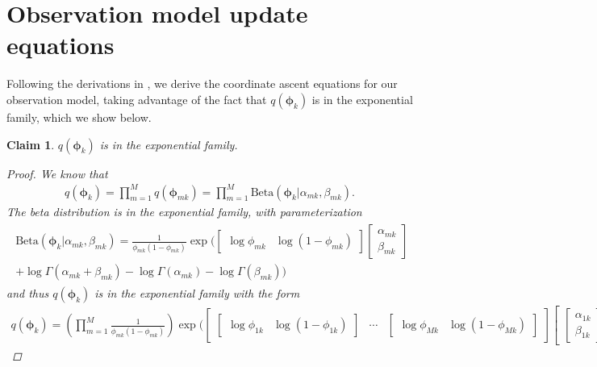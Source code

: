 \documentclass[11pt]{article}
\newtheorem{claim}{Claim}
\begin{document}
\section{Observation model update equations}
Following the derivations in \cite{Hughes2015}, we derive the coordinate ascent equations for our observation model, taking advantage of the fact that $q(\bm{\phi}_k)$ is in the exponential family, which we show below.

\begin{claim}
$q(\bm{\phi}_k)$ is in the exponential family.
\begin{proof}
We know that
\begin{align*}
q(\bm{\phi}_k)  = \prod\limits_{m=1}^M q(\bm{\phi}_{mk}) = \prod\limits_{m=1}^M \mathrm{Beta}(\bm{\phi}_k | \alpha_{mk}, \beta_{mk}).
\end{align*}
The beta distribution is in the exponential family, with parameterization 
\begin{align}
\begin{split}
\mathrm{Beta}(\bm{\phi}_k |  \alpha_{mk}, \beta_{mk}) =  \frac{1}{\phi_{mk}(1 - \phi_{mk})} \exp \bigg(
		\begin{bmatrix}
			\log\phi_{mk} & \log(1 - \phi_{mk})
		\end{bmatrix}
		\begin{bmatrix}
			\alpha_{mk} \\ \beta_{mk}
		\end{bmatrix} \\
+ \log \Gamma(\alpha_{mk} + \beta_{mk}) - \log \Gamma(\alpha_{mk}) - \log\Gamma(\beta_{mk}) \bigg)
\end{split}
\end{align}
and thus $q(\bm{\phi}_k)$ is in the exponential family with the form
\begin{align*}
q(\bm{\phi}_k) = \left(\prod\limits_{m=1}^M \frac{1}{\phi_{mk}(1 - \phi_{mk})} \right) \exp\bigg(
			\begin{bmatrix}
				\begin{bmatrix}
				 \log\phi_{1k} & \log(1 - \phi_{1k} )
				\end{bmatrix} & \cdots &
				\begin{bmatrix}
				 \log\phi_{Mk} & \log(1 - \phi_{Mk})
				\end{bmatrix}
			\end{bmatrix}
			\begin{bmatrix}
				\begin{bmatrix}
				\alpha_{1k} \\ \beta_{1k} 

\end{bmatrix}
\end{bmatrix}
\end{align*}
\end{proof}
\end{claim}
\end{document}
